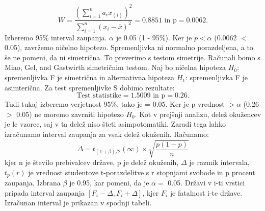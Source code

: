 \documentclass[a4paper,11pt]{article}
\begin{document}
\[W = \frac{(\sum_{i = 1}^{n}a_i x_{(i)})^2}{\sum_{i = 1}^{n}(x_i - \overset{\_}{x})^2} = 0.8851 \text{ in p} = 0.0062. \]
Izberemo 95\% interval zaupanja. \(\alpha\) je 0.05 (1 - 95\%). Ker je \(p < \alpha\) (0.0062 \(<\) 0.05), zavržemo ničelno hipotezo. Spremenljivka ni normalno porazdeljena, a to še ne pomeni, da ni simetrična. To preverimo s testom simetrije. Računali bomo s Miao, Gel, and Gastwirth simetričnim testom. Naj bo ničelna hipoteza \(H_0\): spremenljivka F je simetrična in alternativna hipoteza \(H_1\): spremenljivka F je asimterična. Za test spremenljivke S dobimo rezultate:
\[\text{Test statistike} = 1.5009 \text{ in p} =  0.26.\]
Tudi tukaj izberemo verjetnost 95\%, tako je \alpha = 0.05. Ker je p vrednost \(> \alpha\) (0.26 \(>\) 0.05) ne moremo zavrniti hipotezo \(H_0\). Kot v prejšnji analizu, delež okužencev je le vzorec, saj v ta delež niso šteti asimpotomatiki. Zaradi tega lahko izračunamo interval zaupanja za vsak delež okuženih. Računamo:
\[\Delta = t_{(1 + \beta) /2}(\infty) \times \sqrt{\frac{p(1 - p)}{n}}\]
kjer n je število prebivalcev države, p je delež okuženih, \(\Delta\) je razmik intervala, \(t_{p}(r)\) je vrednost studentove t-porazdelitve s r stopnjami svobode in p procent zaupanja. Izbrana \(\beta\) je 0.95, kar pomeni, da je \(\alpha = \) 0.05. Državi v i-ti vrstici pripada interval zaupanja \([F_i - \Delta, F_i + \Delta]\), kjer \(F_i\) je fatalnost i-te države. Izračunan interval je prikazan v spodnji tabeli.
\begin{center}
\end{center}
\end{document}
